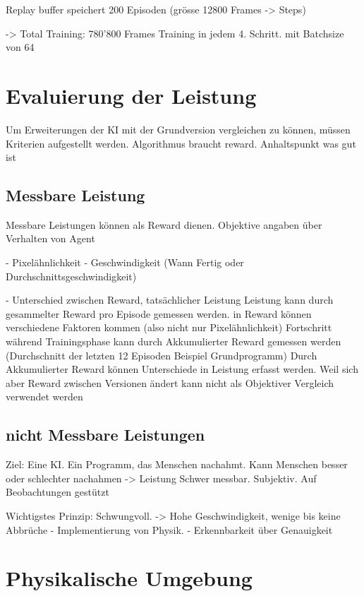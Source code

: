     Replay buffer speichert 200 Episoden (grösse 12800 Frames -> Steps)

    -> Total Training: 780'800 Frames
    Training in jedem 4. Schritt. mit Batchsize von 64



\section{Evaluierung der Leistung}
    Um Erweiterungen der KI mit der Grundversion vergleichen zu können, müssen Kriterien aufgestellt werden. 
    Algorithmus braucht reward. Anhaltspunkt was gut ist
    
    \subsection*{Messbare Leistung}
    Messbare Leistungen können als Reward dienen. Objektive angaben über Verhalten von Agent
    
    - Pixelähnlichkeit
    - Geschwindigkeit (Wann Fertig oder Durchschnittsgeschwindigkeit)
    
    - Unterschied zwischen Reward, tatsächlicher Leistung
      Leistung kann durch gesammelter Reward pro Episode gemessen werden. in Reward können verschiedene Faktoren kommen (also nicht nur Pixelähnlichkeit)
      Fortschritt während Trainingsphase kann durch Akkumulierter Reward gemessen werden (Durchschnitt der letzten 12 Episoden Beispiel Grundprogramm)
      Durch Akkumulierter Reward können Unterschiede in Leistung erfasst werden. Weil sich aber Reward zwischen Versionen ändert kann nicht als Objektiver Vergleich verwendet werden
    
    \subsection*{nicht Messbare Leistungen}
    Ziel: Eine KI. Ein Programm, das Menschen nachahmt. 
    Kann Menschen besser oder schlechter nachahmen -> Leistung
    Schwer messbar. Subjektiv. Auf Beobachtungen gestützt
    
    Wichtigstes Prinzip: Schwungvoll. -> Hohe Geschwindigkeit, wenige bis keine Abbrüche
        - Implementierung von Physik. 
        - Erkennbarkeit über Genauigkeit


\section{Physikalische Umgebung}


